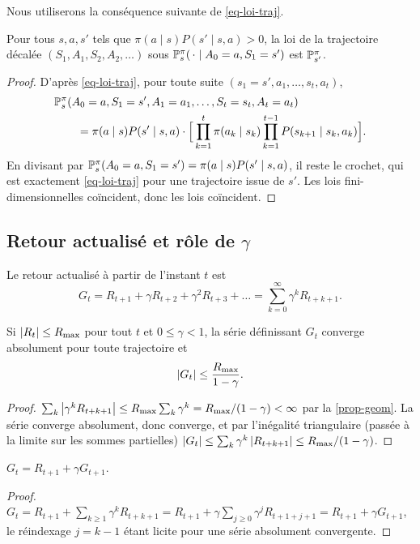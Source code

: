 Nous utiliserons la conséquence suivante de \eqref{eq-loi-traj}.

\begin{lemme}[Redémarrage]\label{lem-redemarrage}
Pour tous $s,a,s'$ tels que $\pi(a\mid s)P(s'\mid s,a)>0$, la loi de la trajectoire décalée $(S_1,A_1,S_2,A_2,\dots)$ sous $\P^\pi_s(\,\cdot\mid A_0=a,S_1=s')$ est $\P^\pi_{s'}$.
\end{lemme}
\begin{proof}
D'après \eqref{eq-loi-traj}, pour toute suite $(s_1=s',a_1,\dots,s_{t},a_t)$,
\[
\begin{split}
&\P^\pi_s(A_0=a,S_1=s',A_1=a_1,\dots,S_t=s_t,A_t=a_t)\\
&\qquad=\pi(a\mid s)P(s'\mid s,a)\cdot\Big[\prod_{k=1}^{t}\pi(a_k\mid s_k)\prod_{k=1}^{t-1}P(s_{k+1}\mid s_k,a_k)\Big].
\end{split}
\]
En divisant par $\P^\pi_s(A_0=a,S_1=s')=\pi(a\mid s)P(s'\mid s,a)$, il reste le crochet, qui est exactement \eqref{eq-loi-traj} pour une trajectoire issue de $s'$. Les lois fini-dimensionnelles coïncident, donc les lois coïncident.
\end{proof}

\subsection{Retour actualisé et rôle de \texorpdfstring{$\gamma$}{gamma}}

\begin{definition}[Retour]
Le retour actualisé à partir de l'instant $t$ est
\[
G_t=R_{t+1}+\gamma R_{t+2}+\gamma^2R_{t+3}+\dots=\sum_{k=0}^{\infty}\gamma^kR_{t+k+1}.
\]
\end{definition}

\begin{proposition}\label{prop-borne-retour}
Si $\abs{R_t}\le\Rmax$ pour tout $t$ et $0\le\gamma<1$, la série définissant $G_t$ converge absolument pour toute trajectoire et
\[
\abs{G_t}\le\frac{\Rmax}{1-\gamma}.
\]
\end{proposition}
\begin{proof}
$\sum_k\abs{\gamma^kR_{t+k+1}}\le\Rmax\sum_k\gamma^k=\Rmax/(1-\gamma)<\infty$ par la \cref{prop-geom}. La série converge absolument, donc converge, et par l'inégalité triangulaire (passée à la limite sur les sommes partielles) $\abs{G_t}\le\sum_k\gamma^k\abs{R_{t+k+1}}\le\Rmax/(1-\gamma)$.
\end{proof}

\begin{proposition}\label{prop-recursion}
$G_t=R_{t+1}+\gamma G_{t+1}$.
\end{proposition}
\begin{proof}
$G_t=R_{t+1}+\sum_{k\ge1}\gamma^kR_{t+k+1}=R_{t+1}+\gamma\sum_{j\ge0}\gamma^jR_{t+1+j+1}=R_{t+1}+\gamma G_{t+1}$, le réindexage $j=k-1$ étant licite pour une série absolument convergente.
\end{proof}

